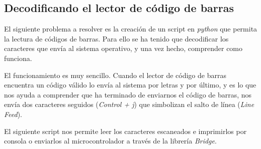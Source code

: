 \subsection{Decodificando el lector de código de barras}

El siguiente problema a resolver es la creación de un script en \emph{python} que permita la lectura de códigos de barras. Para ello se ha tenido que decodificar los caracteres que envía al sistema operativo, y una vez hecho, comprender como funciona.

El funcionamiento es muy sencillo. Cuando el lector de código de barras encuentra un código válido lo envía al sistema por letras y por último, y es lo que nos ayuda a comprender que ha terminado de enviarnos el código de barras, nos envía dos caracteres seguidos (\emph{Control + j}) que simbolizan el salto de línea (\emph{Line Feed}).

El siguiente script nos permite leer los caracteres escaneados e imprimirlos por consola o enviarlos al microcontrolador a través de la librería \emph{Bridge}.

